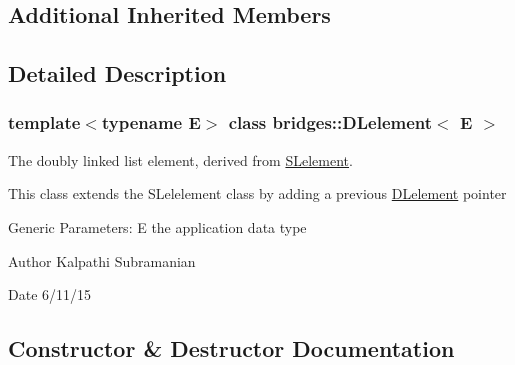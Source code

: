 \subsection*{Additional Inherited Members}


\subsection{Detailed Description}
\subsubsection*{template$<$typename E$>$\newline
class bridges\+::\+D\+Lelement$<$ E $>$}

The doubly linked list element, derived from \mbox{\hyperlink{classbridges_1_1_s_lelement}{S\+Lelement}}. 

This class extends the S\+Lelelement class by adding a previous \mbox{\hyperlink{classbridges_1_1_d_lelement}{D\+Lelement}} pointer

Generic Parameters\+: E the application data type

\begin{DoxyAuthor}{Author}
Kalpathi Subramanian 
\end{DoxyAuthor}
\begin{DoxyDate}{Date}
6/11/15 
\end{DoxyDate}


\subsection{Constructor \& Destructor Documentation}
\mbox{\label{classbridges_1_1_d_lelement_a846424760c641ba5f496615361d8f79c}} 
